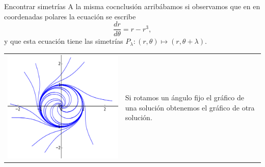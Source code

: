 \documentclass[handout,hyperref={colorlinks=true}]{beamer}
\begin{document}
\begin{frame}{Encontrar simetrías}
A la misma cocnclusión arribábamos si observamos que en en coordenadas polares la ecuación se escribe
\[\frac{dr}{d\theta}=r-r^3,\]
y que esta ecuación tiene las simetrías $P_{\lambda}:(r,\theta)\mapsto (r,\theta+\lambda)$. 





\begin{tabular}{m{6cm} m{4cm}}
\includegraphics[scale=.4]{imagenes/sol_rotadas.png}&
 Si rotamos un ángulo fijo el gráfico de una solución obtenemos el gráfico de otra solución.

  \\
\end{tabular} 
\end{frame}
\end{document}
